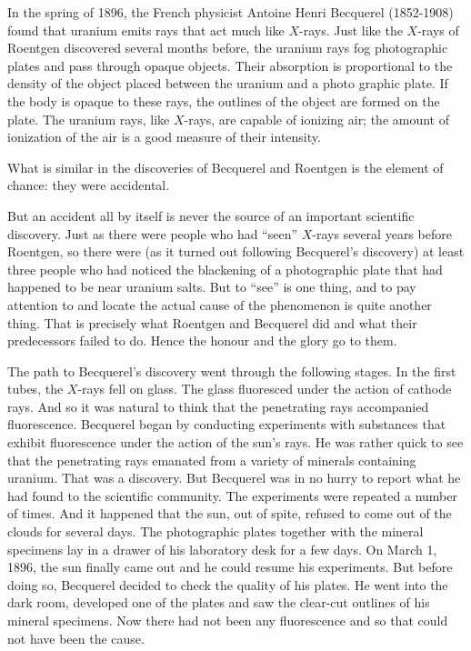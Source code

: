In the spring of 1896, the French physicist Antoine Henri Becquerel (1852-1908) found that uranium emits rays that act much like $X$-rays. Just like the $X$-rays of Roentgen discovered several months before, the uranium rays fog photographic plates and pass through opaque objects. Their absorption is proportional to the density of the object placed between the uranium and a photo­ graphic plate. If the body is opaque to these rays, the outlines of the object are formed on the plate. The urani­um rays, like $X$-rays, are capable of ionizing air; the amount of ionization of the air is a good measure of their intensity.

What is similar in the discoveries of Becquerel and Roentgen is the element of chance: they were accidental.

But an accident all by itself is never the source of an im­portant scientific discovery. Just as there were people who had ``seen'' $X$-rays several years before Roentgen, so there were (as it turned out following Becquerel’s discov­ery) at least three people who had noticed the blackening of a photographic plate that had happened to be near uranium salts. But to ``see'' is one thing, and to pay attention to and locate the actual cause of the phenome­non is quite another thing. That is precisely what Roent­gen and Becquerel did and what their predecessors failed to do. Hence the honour and the glory go to them.

The path to Becquerel’s discovery went through the following stages. In the first tubes, the $X$-rays fell on glass. The glass fluoresced under the action of cathode rays. And so it was natural to think that the penetrating rays accompanied fluorescence. Becquerel began by con­ducting experiments with substances that exhibit fluo­rescence under the action of the sun’s rays. He was rather quick to see that the penetrating rays emanated from a variety of minerals containing uranium. That was a discovery. But Becquerel was in no hurry to report what he had found to the scientific community. The experi­ments were repeated a number of times. And it happened that the sun, out of spite, refused to come out of the clouds for several days. The photographic plates together with the mineral specimens lay in a drawer of his laboratory desk for a few days. On March 1, 1896, the sun finally came out and he could resume his experiments. But before doing so, Becquerel decided to check the qual­ity of his plates. He went into the dark room, developed one of the plates and saw the clear-cut outlines of his mineral specimens. Now there had not been any fluorescence and so that could not have been the cause.

